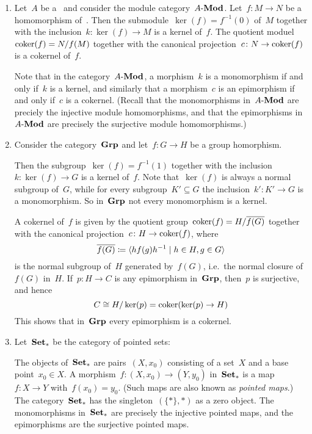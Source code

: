 \begin{example}
  \leavevmode
  \begin{enumerate}
    \item
      Let~$A$ be a~{\kalg} and consider the module category~$\text{$A$-$\mathbf{Mod}$}$.
      Let~$f \colon M \to N$ be a homomorphism of~{}.
      Then the submodule~$\ker(f) = f^{-1}(0)$ of~$M$ together with the inclusion~$k \colon \ker(f) \to M$ is a kernel of~$f$.
      The quotient moduel~$\operatorname{coker}(f) = N/f(M)$ together with the canonical projection~$c \colon N \to \operatorname{coker}(f)$ is a cokernel of~$f$.
      
      Note that in the category~$\text{$A$-$\mathbf{Mod}$}$, a morphism~$k$ is a monomorphism if and only if~$k$ is a kernel, and similarly that a morphism~$c$ is an epimorphism if and only if~$c$ is a cokernel.
      (Recall that the monomorphisms in~$\text{$A$-$\mathbf{Mod}$}$ are preciely the injective module homomorphisms, and that the epimorphisms in~$\text{$A$-$\mathbf{Mod}$}$ are precisely the surjective module homomorphisms.)
    \item
      Consider the category~$\mathbf{Grp}$ and let~$f \colon G \to H$ be a group homorphism.
      
      Then the subgroup~$\ker(f) = f^{-1}(1)$ together with the inclusion~$k \colon \ker(f) \to G$ is a kernel of~$f$.
      Note that~$\ker(f)$ is always a normal subgroup of~$G$, while for every subgroup~$K' \subseteq G$ the inclusion~$k' \colon K' \to G$ is a monomorphism.
      So in~$\mathbf{Grp}$ not every monomorphism is a kernel.
      
      A cokernel of~$f$ is given by the quotient group~$\operatorname{coker}(f) = H/\overline{f(G)}$ together with the canonical projection~$c \colon H \to \operatorname{coker}(f)$, where
      \[
                  \closure{f(G)}
        \defined  \gen{
                    h f(g) h^{-1}
                  \suchthat
                    h \in H, g \in G
                  }
      \]
      is the normal subgroup of~$H$ generated by~$f(G)$, i.e.\ the normal closure of~$f(G)$ in~$H$.
      If~$p \colon H \to C$ is any epimorphism in~$\mathbf{Grp}$, then~$p$ is surjective, and hence
      \[
              C
        \cong H/\ker(p)
        =     \operatorname{coker}(\ker(p) \to H)
      \]
      This shows that in~$\mathbf{Grp}$ every epimorphism is a cokernel.
    \item
      Let~$\mathbf{Set}_*$ be the category of pointed sets:
      
      The objects of~$\mathbf{Set}_*$ are pairs~$(X,x_0)$ consisting of a set~$X$ and a base point~$x_0 \in X$.
      A morphism~$f \colon (X,x_0) \to (Y,y_0)$ in~$\mathbf{Set}_*$ is a map~$f \colon X \to Y$ with~$f(x_0) = y_0$.
      (Such maps are also known as \emph{pointed maps}.)
      The category~$\mathbf{Set}_*$ has the singleton~$(\{\ast\}, \ast)$ as a zero object.
      The monomorphisms in~$\mathbf{Set}_*$ are precisely the injective pointed maps, and the epimorphisms are the surjective pointed maps.
      

\end{enumerate}
\end{example}
